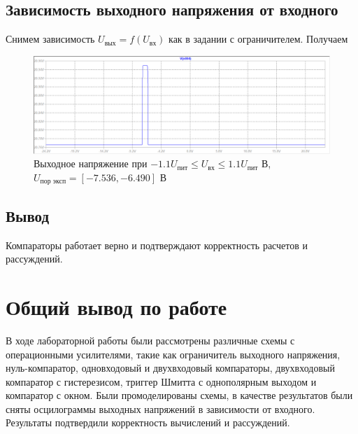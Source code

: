 \documentclass[a4paper, 12pt]{article}
\begin{document}
    \subsection{Зависимость выходного напряжения от входного}
    Снимем зависимость $U_\text{вых}=f\left( U_\text{вх} \right)$ как в задании с ограничителем.
    Получаем
    \begin{figure}[H]
        \centering
        \includegraphics[scale=0.46]{8task_fuin.png}
        \captionsetup{skip=0pt}
        \caption{Выходное напряжение при $-1.1U_\text{пит}\leq U_\text{вх}\leq 1.1U_\text{пит}$ В, $U_\text{пор эксп}=\left[-7.536,-6.490\right]$ В}
        \label{fig:8task_fuin}
    \end{figure}

    
    \subsection{Вывод}
    Компараторы работает верно и подтверждают корректность расчетов и рассуждений.


    \section{Общий вывод по работе}
    В ходе лабораторной работы были рассмотрены различные схемы
    с операционными усилителями, такие как ограничитель выходного напряжения,
    нуль-компаратор, одновходовый и двухвходовый компараторы, 
    двухвходовый компаратор с гистерезисом, триггер Шмитта с однополярным выходом
    и компаратор с окном. Были промоделированы схемы, в качестве результатов
    были сняты осцилограммы выходных напряжений в зависимости от входного.
    Результаты подтвердили корректность вычислений и рассуждений.
\end{document}
